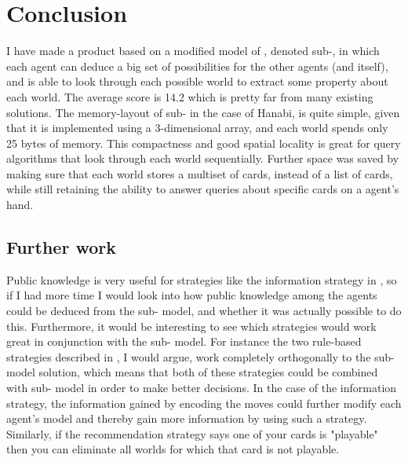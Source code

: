 \section{Conclusion}

I have made a product based on a modified model of \SfiveN{}, denoted sub-\SfiveN{}, in which each agent can deduce a big set of possibilities for the other agents (and itself), and is able to look through each possible world to extract some property about each world.
The average score is 14.2 which is pretty far from many existing solutions.
The memory-layout of sub-\SfiveN{} in the case of Hanabi, is quite simple, given that it is implemented using a 3-dimensional array, and each world spends only 25 bytes of memory.
This compactness and good spatial locality is great for query algorithms that look through each world sequentially. 
Further space was saved by making sure that each world stores a multiset of cards, instead of a list of cards, while still retaining the ability to answer queries about specific cards on a agent's hand.

\subsection{Further work}
Public knowledge is very useful for strategies like the information strategy in \cite{CoxEtAl2015}, so 
if I had more time I would look into how public knowledge among the agents could be deduced from the sub-\SfiveN{} model, and whether it was actually possible to do this.
Furthermore, it would be interesting to see which strategies would work great in conjunction with the sub-\SfiveN{} model.
For instance the two rule-based strategies described in \cite{CoxEtAl2015}, I would argue, work completely orthogonally to the sub-\SfiveN{} model solution, which means that both of these strategies could be combined with sub-\SfiveN{} model in order to make better decisions.
In the case of the information strategy, the information gained by encoding the moves could further modify each agent's model and thereby gain more information by using such a strategy. 
Similarly, if the recommendation strategy says one of your cards is "playable" then you can eliminate all worlds for which that card is not playable.

